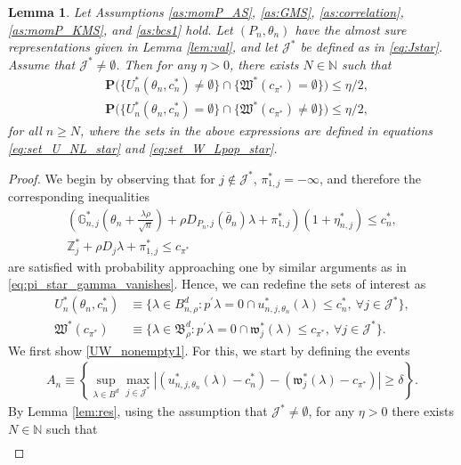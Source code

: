 \documentclass[letterpaper,11pt]{article}
\theoremstyle{myplain}
\newtheorem{lemma}{Lemma}[section]
\theoremstyle{mydefinition}
\theoremstyle{myremark}
\newcommand{\HH}{\mathbb{Z}}
\newcommand{\N}{\mathbb{N}}
\newcommand{\cJ}{\mathcal{J}}
\newcommand{\tlarhon}{\tfrac{\lambda \rho }{\sqrt n}}
\numberwithin{equation}{section}
\numberwithin{figure}{section}
\begin{document}
\begin{appendices}
\begin{lemma}\label{lem:UnonEmpty}
Let Assumptions \ref{as:momP_AS}, \ref{as:GMS}, \ref{as:correlation}, \ref{as:momP_KMS}, and \ref{as:bcs1} hold. Let $(P_n,\theta_n)$ have the almost sure representations given in Lemma \ref{lem:val}, and let $\mathcal J^*$ be defined as in \eqref{eq:Jstar}. Assume that $\mathcal J^* \neq \emptyset$.
Then for any $\eta>0$, there exists  $N \in \N$ such that 
\begin{align}
&\mathbf{P}\Big( \{U^*_{n}(\theta_{n},c^{*}_{n})\neq\emptyset \} \cap \{ \mathfrak{W}^*(c_{\pi^*})= \emptyset \}  \Big)
\le \eta/2,\label{UW_nonempty1}\\
&\mathbf{P}\Big( \{U^*_{n}(\theta_{n},c^{*}_{n})= \emptyset \} \cap \{ \mathfrak{W}^*(c_{\pi^*})\neq \emptyset \} \Big)
\le \eta/2,\label{UW_nonempty2}
\end{align}
for all $n\ge N$, where the sets in the above expressions are defined in equations \eqref{eq:set_U_NL_star} and \eqref{eq:set_W_Lpop_star}.
\end{lemma}
\begin{proof}
We begin by observing that for $j \notin \cJ^*$, $\pi^*_{1,j}=-\infty$, and therefore the corresponding inequalities 
\begin{align*}
 \left(\mathbb G^*_{n,j}(\theta_n+\tlarhon)+\rho D_{P_{n},j}(\bar\theta_n)\lambda+\pi^*_{1,j}\right)(1+\eta^*_{n,j}) \le c_{n}^{*},\\  
 \HH^*_{j}+\rho D_{j}\lambda+\pi^*_{1,j}\le c_{\pi^*}
\end{align*}
are satisfied with probability approaching one by similar arguments as in \eqref{eq:pi_star_gamma_vanishes}. Hence, we can redefine the sets of interest as
\begin{align}
U^*_{n}(\theta_{n},c_{n}^{*})&\equiv	\big\{\lambda\in B^d_{n,\rho}: p^\prime \lambda = 0 \cap u^*_{n,j,\theta_n}(\lambda)\le c_{n}^{*}, \: \forall j \in \cJ^*\big\}, \label{eq:set_U_NL_star_new}\\
 \mathfrak W^*(c_{\pi^*})&\equiv \big\{ \lambda\in \mathfrak B^d_\rho: p^\prime \lambda = 0 \cap \mathfrak{w}^*_{j}(\lambda)\le c_{\pi^*},~\forall j\in\mathcal J^*\big\}.\label{eq:set_W_Lpop_star_new}
\end{align}
We first show \eqref{UW_nonempty1}.
For this, we start by defining the events
\begin{align}
A_{ n} \equiv \left\{\sup_{\lambda \in  B^d} \max_{j \in \cJ^*}\left\vert (u^*_{n,j,\theta_n}(\lambda)-c^*_n)-( \mathfrak{w}^*_{j}(\lambda)-c_{\pi^*}) \right\vert \ge\delta  \right\}\label{eq:int2-2_2}.
\end{align}
By Lemma \ref{lem:res}, using the assumption that $\cJ^* \neq \emptyset$, for any $\eta>0$ there exists $N \in \N$ such that
\begin{align}


\end{align}
\end{proof}
\end{appendices}
\end{document}
